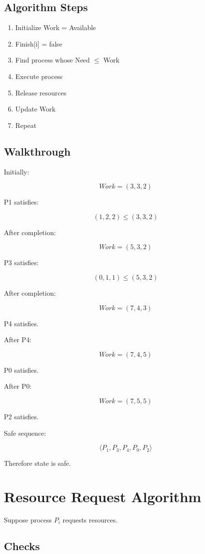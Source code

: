 \subsection{Algorithm Steps}

\begin{enumerate}
\item Initialize Work = Available
\item Finish[i] = false
\item Find process whose Need $\leq$ Work
\item Execute process
\item Release resources
\item Update Work
\item Repeat
\end{enumerate}

\subsection{Walkthrough}

Initially:

\[
Work=(3,3,2)
\]

P1 satisfies:

\[
(1,2,2)\leq(3,3,2)
\]

After completion:

\[
Work=(5,3,2)
\]

P3 satisfies:

\[
(0,1,1)\leq(5,3,2)
\]

After completion:

\[
Work=(7,4,3)
\]

P4 satisfies.

After P4:

\[
Work=(7,4,5)
\]

P0 satisfies.

After P0:

\[
Work=(7,5,5)
\]

P2 satisfies.

Safe sequence:

\[
\langle P_1,P_3,P_4,P_0,P_2 \rangle
\]

Therefore state is safe.

\section{Resource Request Algorithm}

Suppose process \(P_i\) requests resources.

\subsection{Checks}

